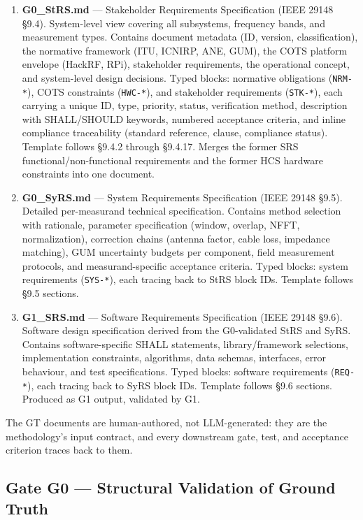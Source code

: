 \documentclass[11pt,a4paper]{article}
\begin{document}
\begin{enumerate}
  \item \textbf{G0\_StRS.md} --- Stakeholder Requirements Specification (IEEE 29148 \S9.4).
    System-level view covering all subsystems, frequency bands, and measurement types. Contains
    document metadata (ID, version, classification), the normative framework (ITU, ICNIRP, ANE,
    GUM), the COTS platform envelope (HackRF, RPi), stakeholder requirements, the operational
    concept, and system-level design decisions. Typed blocks: normative obligations
    (\texttt{NRM-*}), COTS constraints (\texttt{HWC-*}), and stakeholder requirements
    (\texttt{STK-*}), each carrying a unique ID, type, priority, status, verification method,
    description with SHALL/SHOULD keywords, numbered acceptance criteria, and inline compliance
    traceability (standard reference, clause, compliance status). Template follows \S9.4.2
    through \S9.4.17. Merges the former SRS functional/non-functional requirements and the former
    HCS hardware constraints into one document.
  \item \textbf{G0\_SyRS.md} --- System Requirements Specification (IEEE 29148 \S9.5). Detailed
    per-measurand technical specification. Contains method selection with rationale, parameter
    specification (window, overlap, NFFT, normalization), correction chains (antenna factor,
    cable loss, impedance matching), GUM uncertainty budgets per component, field measurement
    protocols, and measurand-specific acceptance criteria. Typed blocks: system requirements
    (\texttt{SYS-*}), each tracing back to StRS block IDs. Template follows \S9.5 sections.
  \item \textbf{G1\_SRS.md} --- Software Requirements Specification (IEEE 29148 \S9.6). Software
    design specification derived from the G0-validated StRS and SyRS. Contains software-specific
    SHALL statements, library/framework selections, implementation constraints, algorithms, data
    schemas, interfaces, error behaviour, and test specifications. Typed blocks: software
    requirements (\texttt{REQ-*}), each tracing back to SyRS block IDs. Template follows \S9.6
    sections. Produced as G1 output, validated by G1.
\end{enumerate}

The GT documents are human-authored, not LLM-generated: they are the methodology's input
contract, and every downstream gate, test, and acceptance criterion traces back to them.

\subsection{Gate G0 --- Structural Validation of Ground Truth}
\label{sec:g0}
\end{document}
